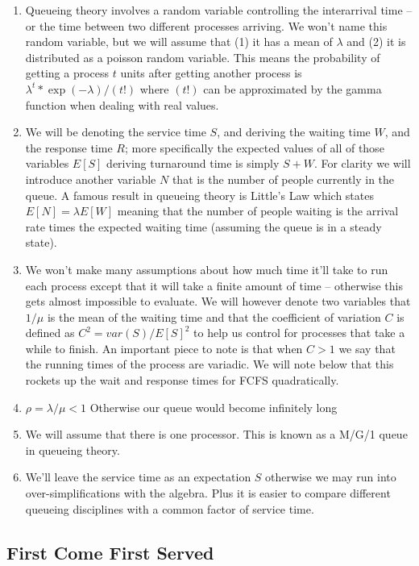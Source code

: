 \begin{enumerate}
\item Queueing theory involves a random variable controlling the interarrival time -- or the time between two different processes arriving.
We won't name this random variable, but we will assume that (1) it has a mean of $\lambda$ and (2) it is distributed as a poisson random variable. This means the probability of getting a process $t$ units after getting another process is $\lambda^t * \exp(-\lambda)/(t!)$ where $(t!)$ can be approximated by the gamma function when dealing with real values.
\item We will be denoting the service time $S$, and deriving the waiting time $W$, and the response time $R$; more specifically the expected values of all of those variables $E[S]$ deriving turnaround time is simply $S + W$. For clarity we will introduce another variable $N$ that is the number of people currently in the queue. A famous result in queueing theory is Little's Law which states $E[N] = \lambda E[W]$ meaning that the number of people waiting is the arrival rate times the expected waiting time (assuming the queue is in a steady state).
\item We won't make many assumptions about how much time it'll take to run each process except that it will take a finite amount of time -- otherwise this gets almost impossible to evaluate.
We will however denote two variables that $1 / \mu$ is the mean of the waiting time and that the coefficient of variation $C$ is defined as $C^2 = var(S) / E[S]^2$ to help us control for processes that take a while to finish.
An important piece to note is that when $C > 1$ we say that the running times of the process are variadic. We will note below that this rockets up the wait and response times for FCFS quadratically.
\item $\rho = \lambda / \mu < 1$ Otherwise our queue would become infinitely long
\item We will assume that there is one processor. This is known as a M/G/1 queue in queueing theory.
\item We'll leave the service time as an expectation $S$ otherwise we may run into over-simplifications with the algebra. Plus it is easier to compare different queueing disciplines with a common factor of service time.
\end{enumerate}

\subsection{First Come First Served}

